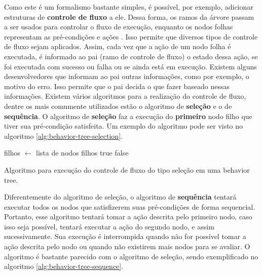 Como este é um formalismo bastante simples, é possível, por exemplo, adicionar
estruturas de \textbf{controle de fluxo} a ele. Dessa forma, os ramos da árvore
passam a ser usados para controlar o fluxo de execução, enquanto os nodos folhas
representam as pré-condições e ações \cite[Cap.  10]{Rabin:2015:GAP:2821138}.
Isso permite que diversos tipos de controle de fluxo sejam aplicados. Assim,
cada vez que a ação de um nodo folha é executada, é informado ao pai (ramo de
controle de fluxo) o estado dessa ação, se foi executada com sucesso ou falha ou
se ainda está em execução.  Existem alguns desenvolvedores que informam ao pai
outras informações, como por exemplo, o motivo do erro. Isso permite que o pai
decida o que fazer baseado nessas informações. Existem vários algoritmos para a
realização do controle de fluxo, dentre os mais comumente utilizados estão o
algoritmo de \textbf{seleção} e o de \textbf{sequência}. O algoritmo de
\textbf{seleção} faz a execução do \textbf{primeiro} nodo filho que tiver sua
pré-condição satisfeita. Um exemplo do algoritmo pode ser visto no algoritmo
\ref{alg:behavior-tree-selection}.

\begin{algorithm}[H]
\begin{center}
	\begin{algorithmic}[1]
        \STATE filhos $\gets$ lista de nodos filhos
                \RETURN true
            \ENDIF
        \ENDFOR
        \RETURN false
    \end{algorithmic}
\end{center}
\caption[Algoritmo para execução do controle de fluxo do tipo seleção em uma
behavior tree.]
{\label{alg:behavior-tree-selection} Algoritmo para execução do controle de
fluxo do tipo seleção em uma behavior tree.}
\end{algorithm}

Diferentemente do algoritmo de seleção, o algoritmo de \textbf{sequência}
tentará executar todos os nodos que satisfizerem suas pré-condições de forma
sequencial. Portanto, esse algoritmo tentará tomar a ação descrita pelo primeiro
nodo, caso isso seja possível, tentará executar a ação do segundo nodo, e assim
sucessivamente. Sua execução é interrompida quando não for possível tomar a ação
descrita pelo nodo ou quando não existirem mais nodos para se avaliar. O
algoritmo é bastante parecido com o algoritmo de seleção, sendo exemplificado no
algoritmo \ref{alg:behavior-tree-sequence}.

